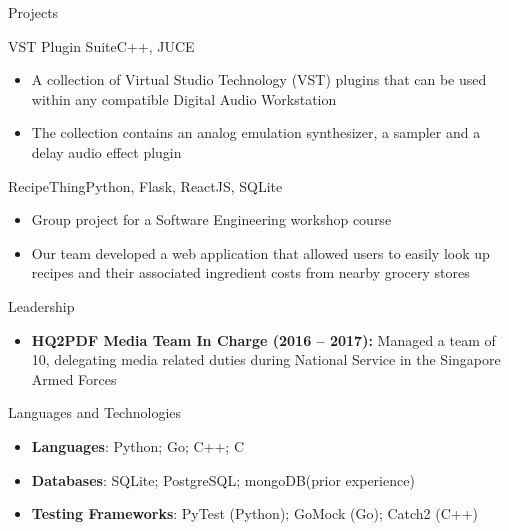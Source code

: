 \documentclass[]{mcdowellcv}
\begin{document}
	\begin{cvsection}{Projects}
		\begin{cvsubsectionproject}{VST Plugin Suite}{}{C++, JUCE}
			\begin{itemize}
				\item A collection of Virtual Studio Technology (VST) plugins that can be used within any compatible Digital Audio Workstation
				\item The collection contains an analog emulation synthesizer, a sampler and a delay audio effect plugin
			\end{itemize}
		\end{cvsubsectionproject}
		
		\begin{cvsubsectionproject}{RecipeThing}{}{Python, Flask, ReactJS, SQLite}
			\begin{itemize}
				\item Group project for a Software Engineering workshop course
				\item Our team developed a web application that allowed users to easily look up recipes and their associated ingredient costs from nearby grocery stores
			\end{itemize}
		\end{cvsubsectionproject}
		
	\end{cvsection}
	
	\begin{cvsection}{Leadership}
		\begin{cvsubsection}{}{}{}	
			\begin{itemize}
				\item \textbf{HQ2PDF Media Team In Charge (2016 – 2017):} Managed a team of 10, delegating media related duties during National Service in the Singapore Armed Forces
			\end{itemize}
		\end{cvsubsection}
	\end{cvsection}
	
	\begin{cvsection}{Languages and Technologies}
		\begin{cvsubsection}{}{}{}	
			\begin{itemize}
				\item \textbf{Languages}: Python; Go; C++; C
				\item \textbf{Databases}: SQLite; PostgreSQL; mongoDB(prior experience)
				\item \textbf{Testing Frameworks}: PyTest (Python); GoMock (Go); Catch2 (C++)
			\end{itemize}
		\end{cvsubsection}
	\end{cvsection}
	
\end{document}
